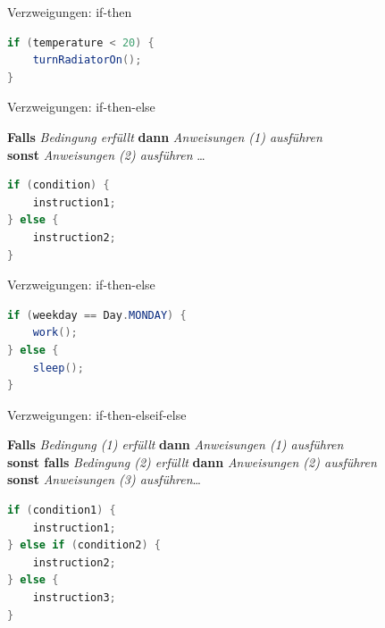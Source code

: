 \documentclass[18pt]{beamer}
\begin{document}
\begin{frame}[fragile]{Verzweigungen: if-then}
    \begin{exampleblock}{}
        \begin{lstlisting}[language=Java]
if (temperature < 20) {
    turnRadiatorOn();
}
        \end{lstlisting}
    \end{exampleblock}
\end{frame}

\begin{frame}[fragile]{Verzweigungen: if-then-else}
    \begin{block}{}
        \textbf{Falls} \textit{Bedingung erfüllt} \textbf{dann} \textit{Anweisungen (1) ausführen}\\
        \textbf{sonst} \textit{Anweisungen (2) ausführen} \dots
    \end{block}
    \pause

    \begin{block}{}
        \begin{lstlisting}[language=Java]
if (condition) {
    instruction1;
} else {
    instruction2;
}
        \end{lstlisting}
    \end{block}
\end{frame}

\begin{frame}[fragile]{Verzweigungen: if-then-else}
    \begin{exampleblock}{}
        \begin{lstlisting}[language=Java]
if (weekday == Day.MONDAY) {
    work();
} else {
    sleep();
}
        \end{lstlisting}
    \end{exampleblock}
\end{frame}

\begin{frame}[fragile]{Verzweigungen: if-then-elseif-else}
    \begin{block}{}
        \textbf{Falls} \textit{Bedingung (1) erfüllt} \textbf{dann} \textit{Anweisungen (1) ausführen}\\
        \textbf{sonst falls} \textit{Bedingung (2) erfüllt} \textbf{dann} \textit{Anweisungen (2) ausführen}\\
        \textbf{sonst} \textit{Anweisungen (3) ausführen}\dots
    \end{block}
    \pause

    \begin{block}{}
        \begin{lstlisting}[language=Java]
if (condition1) {
    instruction1;
} else if (condition2) {
    instruction2;
} else {
    instruction3;
}
        \end{lstlisting}
    \end{block}
\end{frame}
\end{document}
